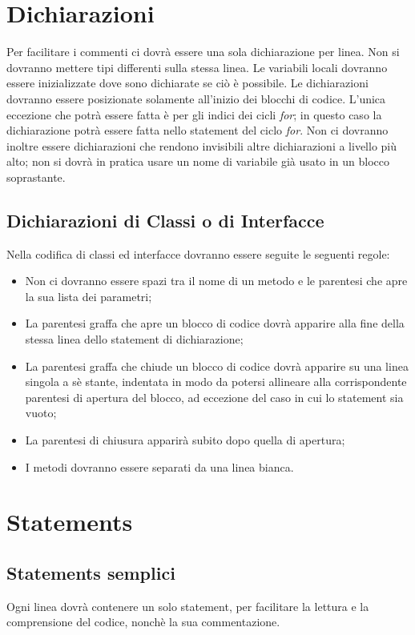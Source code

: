 \section{Dichiarazioni}
Per facilitare i commenti ci dovr\`a essere una sola dichiarazione per linea. Non si dovranno mettere tipi differenti sulla stessa linea. Le variabili locali dovranno essere inizializzate dove sono dichiarate se ci\`o \`e possibile. Le dichiarazioni dovranno essere posizionate solamente all'inizio dei blocchi di codice. L'unica eccezione che potr\`a essere fatta è per gli indici dei cicli \textit{for}; in questo caso la dichiarazione potr\`a essere fatta nello statement del ciclo \textit{for}. Non ci dovranno inoltre essere dichiarazioni che rendono invisibili altre dichiarazioni a livello pi\`u alto; non si dovr\`a in pratica usare un nome di variabile gi\`a usato in un blocco soprastante.
\subsection{Dichiarazioni di Classi o di Interfacce}
Nella codifica di classi ed interfacce dovranno essere seguite le seguenti regole:
\begin{itemize}
\item Non ci dovranno essere spazi tra il nome di un metodo e le parentesi che apre la sua lista dei parametri;
\item La parentesi graffa che apre un blocco di codice dovr\`a apparire alla fine della stessa linea dello statement di dichiarazione;
\item La parentesi graffa che chiude un blocco di codice dovr\`a apparire su una linea singola a s\`e stante, indentata in modo da potersi allineare alla corrispondente parentesi di apertura del blocco, ad eccezione del caso in cui lo statement sia vuoto;
\item La parentesi di chiusura apparir\`a subito dopo quella di apertura;
\item I metodi dovranno essere separati da una linea bianca.
\end{itemize}

\section{Statements}
\subsection{Statements semplici}
Ogni linea dovr\`a contenere un solo statement, per facilitare la lettura e la comprensione del codice, nonch\`e la sua commentazione.
